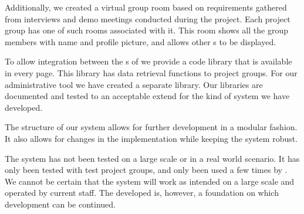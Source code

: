 Additionally, we created a virtual group room based on requirements gathered from interviews and demo meetings conducted during the project.
Each project group has one of such rooms associated with it.
This room shows all the group members with name and profile picture, and allows other \block{}s to be displayed.

To allow integration between the \subsystem{}s of \system{} we provide a code library that is available in every \moodle{} page.
This library has data retrieval functions to project groups.
For our administrative tool we have created a separate library.
Our libraries are documented and tested to an acceptable extend for the kind of system we have developed.

The structure of our system allows for further development in a modular fashion.
It also allows for changes in the implementation while keeping the system robust.

The system has not been tested on a large scale or in a real world scenario.
It has only been tested with test project groups, and only been used a few times by \admpers{}.
We cannot be certain that the system will work as intended on a large scale and operated by current staff.
The developed \subsystem{} is, however, a foundation on which development can be continued.












